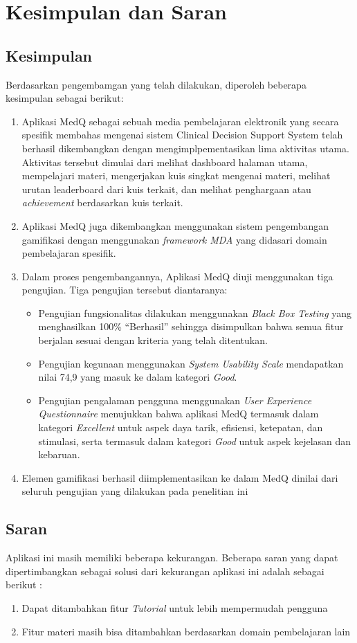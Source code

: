 \chapter{Kesimpulan dan Saran}

\section{Kesimpulan}

Berdasarkan pengembamgan yang telah dilakukan, diperoleh beberapa kesimpulan sebagai berikut:
\begin{enumerate}
    \item Aplikasi MedQ sebagai sebuah media pembelajaran elektronik yang secara spesifik membahas mengenai sistem Clinical Decision Support System telah berhasil dikembangkan dengan mengimplpementasikan lima aktivitas utama. Aktivitas tersebut dimulai dari melihat dashboard halaman utama, mempelajari materi, mengerjakan kuis singkat mengenai materi, melihat urutan leaderboard dari kuis terkait, dan melihat penghargaan atau \textit{achievement} berdasarkan kuis terkait.
    \item Aplikasi MedQ juga dikembangkan menggunakan sistem pengembangan gamifikasi dengan menggunakan \textit{framework MDA} yang didasari domain pembelajaran spesifik. 
    \item Dalam proses pengembangannya, Aplikasi MedQ diuji menggunakan tiga pengujian. Tiga pengujian tersebut diantaranya:
    \begin{itemize}
        \item Pengujian fungsionalitas dilakukan menggunakan \textit{Black Box  Testing} yang menghasilkan 100\% “Berhasil” sehingga disimpulkan bahwa semua fitur berjalan sesuai dengan kriteria yang telah ditentukan. 
        \item Pengujian kegunaan menggunakan \textit{System Usability Scale} mendapatkan nilai 74,9 yang masuk ke dalam kategori \textit{Good}.
        \item Pengujian pengalaman pengguna menggunakan \textit{User Experience Questionnaire} menujukkan bahwa aplikasi MedQ termasuk dalam kategori \textit{Excellent} untuk aspek daya tarik, efisiensi, ketepatan, dan stimulasi, serta termasuk dalam kategori \textit{Good} untuk aspek kejelasan dan kebaruan. 
    \end{itemize}
    \item Elemen gamifikasi berhasil diimplementasikan ke dalam MedQ dinilai dari seluruh pengujian yang dilakukan pada penelitian ini
\end{enumerate}
\section{Saran}
Aplikasi ini masih memiliki beberapa kekurangan. Beberapa saran yang 
dapat dipertimbangkan sebagai solusi dari kekurangan aplikasi ini adalah sebagai 
berikut :
\begin{enumerate}
    \item Dapat ditambahkan fitur \textit{Tutorial} untuk lebih mempermudah pengguna
    \item Fitur materi masih bisa ditambahkan berdasarkan domain pembelajaran lain
\end{enumerate}